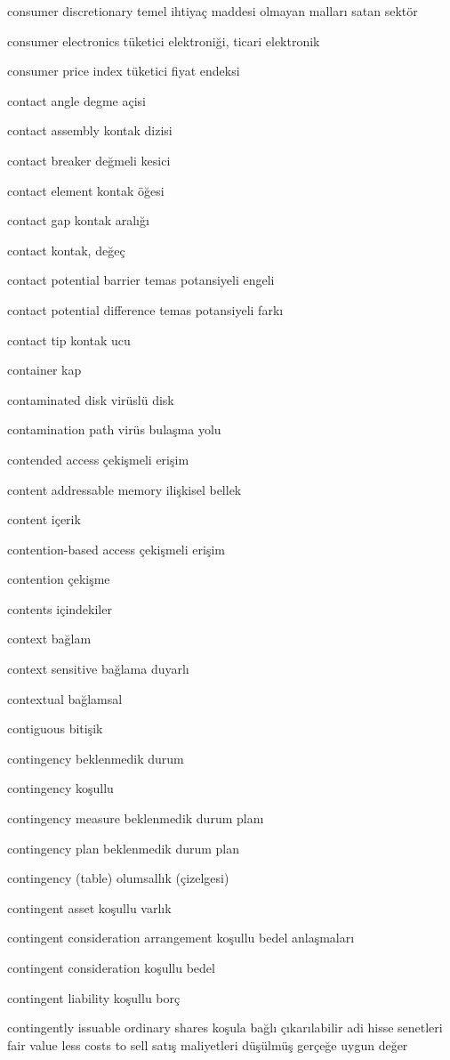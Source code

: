 \documentclass[12pt,fleqn]{article}\usepackage{../../common}
\begin{document}
consumer discretionary temel ihtiyaç maddesi olmayan malları satan sektör

consumer electronics tüketici elektroniği, ticari elektronik

consumer price index tüketici fiyat endeksi

contact angle degme açisi

contact assembly kontak dizisi

contact breaker değmeli kesici

contact element kontak öğesi

contact gap kontak aralığı

contact kontak, değeç

contact potential barrier temas potansiyeli engeli

contact potential difference temas potansiyeli farkı

contact tip kontak ucu

container kap

contaminated disk virüslü disk

contamination path virüs bulaşma yolu

contended access çekişmeli erişim

content addressable memory ilişkisel bellek

content içerik

contention-based access çekişmeli erişim

contention çekişme

contents içindekiler

context bağlam

context sensitive bağlama duyarlı

contextual bağlamsal

contiguous bitişik

contingency beklenmedik durum

contingency koşullu

contingency measure beklenmedik durum planı

contingency plan beklenmedik durum plan

contingency (table) olumsallık (çizelgesi)

contingent asset koşullu varlık

contingent consideration arrangement koşullu bedel anlaşmaları

contingent consideration koşullu bedel

contingent liability koşullu borç

contingently issuable ordinary shares koşula bağlı çıkarılabilir adi hisse senetleri fair value less costs to sell satış maliyetleri düşülmüş gerçeğe uygun değer
\end{document}
